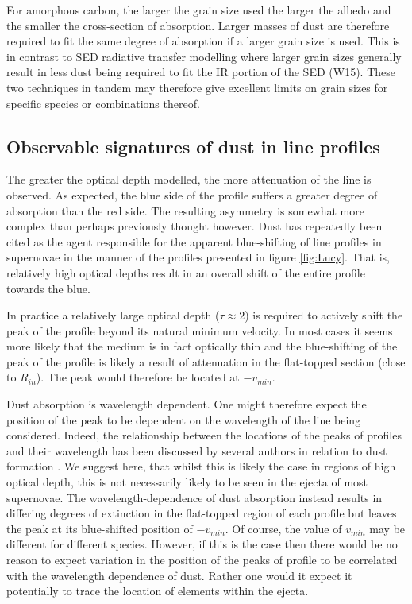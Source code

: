 \documentclass[useAMS,usenatbib,usegraphicx]{mnras}
\begin{document}
For amorphous carbon, the larger the grain size used the larger the albedo and the smaller the cross-section of absorption.  Larger masses of dust are therefore required to fit the same degree of absorption if a larger grain size is used.  This is in contrast to SED radiative transfer modelling where larger grain sizes generally result in less dust being required to fit the IR portion of the SED (W15).  These two techniques in tandem may therefore give excellent limits on grain sizes for specific species or combinations thereof.

\subsection{Observable signatures of dust in line profiles}
\label{asym}
The greater the optical depth modelled, the more attenuation of the line is observed.  As expected, the blue side of the profile suffers a greater degree of absorption than the red side.  The resulting asymmetry is somewhat more complex than perhaps previously thought however.  Dust has repeatedly been cited as the agent responsible for the apparent blue-shifting of line profiles in supernovae in the manner of the profiles presented in figure \ref{fig:Lucy}.  That is, relatively high optical depths result in an overall shift of the entire profile towards the blue.

In practice a relatively large optical depth ($\tau \approx 2$) is required to actively shift the peak of the profile beyond its natural minimum velocity.  In most cases it seems more likely that the medium is in fact optically thin and the blue-shifting of the peak of the profile is likely a result of attenuation in the flat-topped section (close to $R_{in}$).  The peak would therefore be located at $-v_{min}$.  

Dust absorption is wavelength dependent.  One might therefore expect the position of the peak to be dependent on the wavelength of the line being considered.  Indeed, the relationship between the locations of the peaks of profiles and their wavelength has been discussed by several authors in relation to dust formation \citep{Gall2014,Fransson2013,Smith2012}.  We suggest here, that whilst this is likely the case in regions of high optical depth, this is not necessarily likely to be seen in the ejecta of most supernovae.  The wavelength-dependence of dust absorption instead results in differing degrees of extinction in the flat-topped region of each profile but leaves the peak at its blue-shifted position of $-v_{min}$.  Of course, the value of $v_{min}$ may be different for different species.  However, if this is the case then there would be no reason to expect variation in the position of the peaks of profile to be correlated with the wavelength dependence of dust.  Rather one would it expect it potentially to trace the location of elements within the ejecta.
\end{document}
